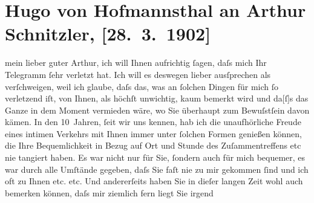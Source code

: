 

               \section[Hugo von Hofmannsthal an Arthur Schnitzler, {[}28. 3. 1902{]}]{ Hugo von Hofmannsthal an Arthur Schnitzler, {[}28. 3. 1902{]}}\nopagebreak{}\rehead{ }\normalsize\beginnumbering{} \toendnotes[C]{\smallbreak\pagebreak[2]} 
\toendnotes[C]{\smallbreak}\pstart{}{\pb}mein lieber guter
                  Arthur,\pend\pstart
           ich will Ihnen aufrichtig ſagen, daſs mich Ihr Telegramm ſehr verletzt hat. Ich will
               es deswegen lieber ausſprechen als verſchweigen, weil ich glaube, daſs das, was an
               ſolchen Dingen für mich ſo verletzend iſt, von Ihnen, als höchſt unwichtig, kaum {\pb}bemerkt wird und
                  da{[}ſ{]}s das Ganze in dem Moment vermieden wäre, wo Sie überhaupt
               zum Bewuſstſein davon kämen.\pend
           \pstart
           In den 10 Jahren, ſeit wir uns kennen, hab ich die unaufhörliche Freude eines intimen
               Verkehrs mit Ihnen immer unter ſolchen Formen {\pb}genießen können, die Ihre
               Bequemlichkeit in Bezug auf Ort und Stunde des Zuſammentreffens etc nie tangiert
               haben. Es war nicht nur für Sie, ſondern auch für mich bequemer, es war durch alle
               Umſtände gegeben, daſs Sie faſt nie zu mir gekommen ſind und ich oft zu Ihnen etc.
               etc.\pend
           \pstart
           {\pb}Und andererſeits haben Sie in
               dieſer langen Zeit wohl auch bemerken können, daſs mir ziemlich fern liegt Sie irgend

